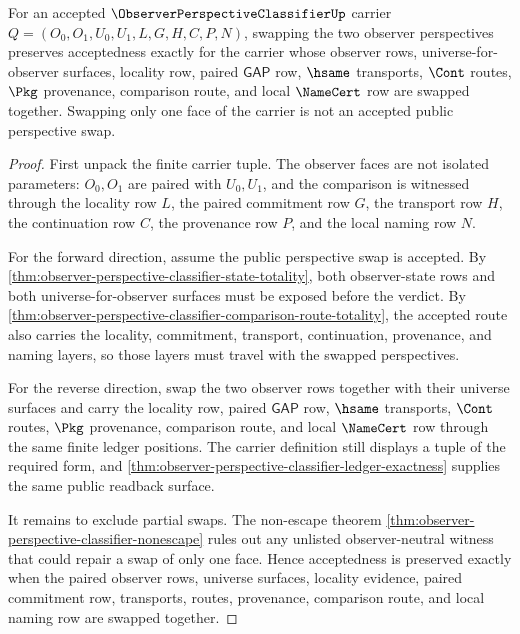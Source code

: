 \begin{theorem}
\label{thm:observer-perspective-classifier-perspective-stability}
For an accepted $\ObserverPerspectiveClassifierUp$ carrier $Q=(O_0,O_1,U_0,U_1,L,G,H,C,P,N)$, swapping the two observer perspectives preserves acceptedness exactly for the carrier whose observer rows, universe-for-observer surfaces, locality row, paired $\mathsf{GAP}$ row, $\hsame$ transports, $\Cont$ routes, $\Pkg$ provenance, comparison route, and local $\NameCert$ row are swapped together. Swapping only one face of the carrier is not an accepted public perspective swap.
\end{theorem}
\begin{proof}
First unpack the finite carrier tuple. The observer faces are not isolated parameters: $O_0,O_1$ are paired with $U_0,U_1$, and the comparison is witnessed through the locality row $L$, the paired commitment row $G$, the transport row $H$, the continuation row $C$, the provenance row $P$, and the local naming row $N$.

For the forward direction, assume the public perspective swap is accepted. By \autoref{thm:observer-perspective-classifier-state-totality}, both observer-state rows and both universe-for-observer surfaces must be exposed before the verdict. By \autoref{thm:observer-perspective-classifier-comparison-route-totality}, the accepted route also carries the locality, commitment, transport, continuation, provenance, and naming layers, so those layers must travel with the swapped perspectives.

For the reverse direction, swap the two observer rows together with their universe surfaces and carry the locality row, paired $\mathsf{GAP}$ row, $\hsame$ transports, $\Cont$ routes, $\Pkg$ provenance, comparison route, and local $\NameCert$ row through the same finite ledger positions. The carrier definition still displays a tuple of the required form, and \autoref{thm:observer-perspective-classifier-ledger-exactness} supplies the same public readback surface.

It remains to exclude partial swaps. The non-escape theorem \autoref{thm:observer-perspective-classifier-nonescape} rules out any unlisted observer-neutral witness that could repair a swap of only one face. Hence acceptedness is preserved exactly when the paired observer rows, universe surfaces, locality evidence, paired commitment row, transports, routes, provenance, comparison route, and local naming row are swapped together.
\end{proof}

